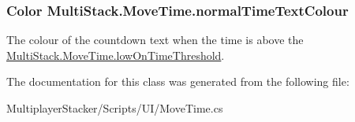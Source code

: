 \subsubsection[{normal\+Time\+Text\+Colour}]{\setlength{\rightskip}{0pt plus 5cm}Color Multi\+Stack.\+Move\+Time.\+normal\+Time\+Text\+Colour}\label{class_multi_stack_1_1_move_time_a31e3512da14ba52898e306c4d8b63320}


The colour of the countdown text when the time is above the \hyperlink{class_multi_stack_1_1_move_time_a1f9dcd4f0bb8bd038f486c5a0ac2478e}{Multi\+Stack.\+Move\+Time.\+low\+On\+Time\+Threshold}. 



The documentation for this class was generated from the following file\+:\begin{DoxyCompactItemize}
\item 
Multiplayer\+Stacker/\+Scripts/\+U\+I/Move\+Time.\+cs\end{DoxyCompactItemize}
